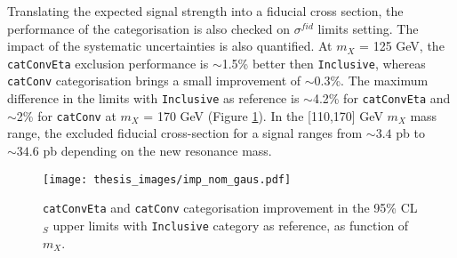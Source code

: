 \documentclass[a4paper, oneside, 11pt, openright]{book}
\begin{document}
 			\iffalse
 			\begin{figure}
 				\centering
 				\subfloat[Expected and observed $p_0$ values for \texttt{Inclusive}]{\texttt{[image: thesis\_images/p0\_no\_catConvEta.pdf]}\label{fig:p0_inc}}\\			
 				\subfloat[Expected and observed $p_0$ values for \texttt{catConvEta}]{\texttt{[image: thesis\_images/p0\_catConvEta.pdf]}\label{fig:p0_catConvEta}}\\	
 				\subfloat[Expected and observed $p_0$ values for \texttt{catConv}]{\texttt{[image: thesis\_images/p0\_catConv.pdf]}\label{fig:p0_catConv}}
 				\caption{Expected $p_0$ values and observed ones values obtained by using Asimov dataset with $\mu$=1 and m$_X$ = 125 (140) GeV, for the different categorisation, as function of $m_X$.}
 				\label{fig:p0_e_o}
 			\end{figure}
 			\fi
 			Translating the expected signal strength into a fiducial cross section, the performance of the categorisation is also checked on $\sigma^{fid}$ limits setting. The impact of the systematic uncertainties is also quantified. At $m_X$ = 125 GeV, the \texttt{catConvEta} exclusion performance is $\sim$1.5\% better then \texttt{Inclusive}, whereas \texttt{catConv} categorisation brings a small improvement of $\sim$0.3\%. The maximum difference in the limits with \texttt{Inclusive} as reference is $\sim$4.2\% for \texttt{catConvEta} and $\sim$2\% for \texttt{catConv} at $m_X$ = 170 GeV (Figure \ref{fig:limits_comp}). In the [110,170] GeV $m_X$ mass range, the excluded fiducial cross-section for a signal ranges from $\sim 3.4$ pb to $\sim 34.6$ pb depending on the new resonance mass. 
 			\begin{figure}
 				\centering
 				\texttt{[image: thesis\_images/imp\_nom\_gaus.pdf]}
 				\caption{\texttt{catConvEta} and \texttt{catConv} categorisation improvement in the 95\% CL$_S$ upper limits with \texttt{Inclusive} category as reference, as function of $m_X$.}
 				\label{fig:limits_comp}
 			\end{figure}
 		 
\end{document}
